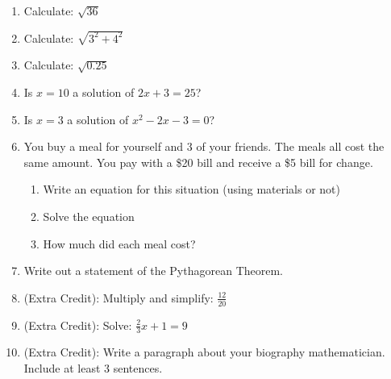 \documentclass[12pt]{article}
\begin{document}
\begin{enumerate}
	\item Calculate: $\displaystyle \sqrt{36}$
	
	\item Calculate: $\displaystyle \sqrt{3^2 + 4^2}$
	
	\item Calculate: $ \sqrt{0.25}$

	\item Is $x=10$ a solution of $2x+3=25$?
	
	\item Is $x=3$ a solution of $x^2-2x-3=0$?
		
	\item You buy a meal for yourself and 3 of your friends.  The meals all cost the same amount.  You pay with a \$20 bill and receive a \$5 bill for change.
	\begin{enumerate}
		\item 	Write an equation for this situation (using materials or not)
		\item Solve the equation
		\item How much did each meal cost?
	\end{enumerate}

	\item Write out a statement of the Pythagorean Theorem.
	
	\pagebreak
	
	\item (Extra Credit): Multiply and simplify: $\displaystyle \frac{12}{20}$

	\item (Extra Credit): Solve: $\displaystyle \frac{2}{3} x + 1 = 9$
	
	\item (Extra Credit): Write a paragraph about your biography mathematician.  Include at least 3 sentences.
\end{enumerate}
\end{document}

